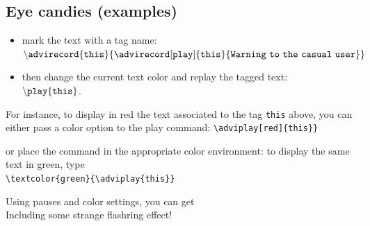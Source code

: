 \documentclass[12pt]{article}
\begin{document}
\newpage 

\subsection* {Eye candies (examples)}

\begin{itemize}
   \item mark the text with a tag name:\\
     $\tt \backslash advirecord\{this\}
      \{\advirecord[play]{this}{Warning~to~the~casual~user}\}$

   \item then change the current text color and replay the tagged text:\\
  $\tt{\backslash}play\{this\}$.
\end{itemize}


\noindent
For instance, to display in red the text associated to the tag
{\tt this} above, you can either pass a color option to the play command:
\verb+\adviplay[red]{this}}+\\
\adviwait%
\textcolor {c1}{}\adviwait
{}\adviwait

\noindent
or place the command in the appropriate color environment:
to display the same text in green, type\\
\verb+\textcolor{green}{\adviplay{this}}+\\
\adviwait
\textcolor{green}{\adviwait}

\noindent
Using pauses and color settings, you can get
\textcolor{red}{}\adviwait
{}
\textcolor{c2}{}\adviwait
{}
\textcolor{c3}{}\adviwait
{}
\textcolor{c4}{}\adviwait
{}
\textcolor{c5}{}\adviwait
{}
\textcolor{c6}{}\adviwait
{}\\
\textcolor{red}{}\adviwait
Including some strange flashring effect!
\textcolor{c6}{}\adviwait[\smallpause]%
\textcolor{c1}{}\adviwait[\smallpause]%
\textcolor{c2}{}\adviwait[\smallpause]%
\textcolor{c3}{}\adviwait[\smallpause]%
\textcolor{c4}{}\adviwait[\smallpause]%
\textcolor{c5}{}\adviwait[\smallpause]%
\textcolor{c6}{}\adviwait[\smallpause]%
\textcolor{c1}{}\adviwait[\smallpause]%
\textcolor{c2}{}\adviwait[\smallpause]%
\textcolor{c3}{}\adviwait[\smallpause]%
\textcolor{c4}{}\adviwait[\smallpause]%
\textcolor{c5}{}\adviwait[\smallpause]%
\textcolor{c6}{}\adviwait[\smallpause]%
\end{document}
